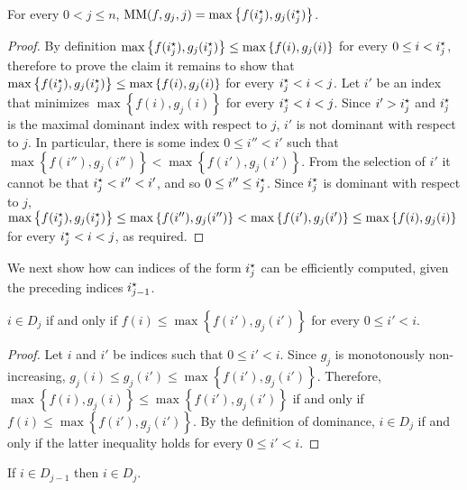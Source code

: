 \begin{claim}
\label{clm:dominant}
	For every $0 < j \leq n$, $\text{MM}(f, g_j, j) = \max\left\{f(\optIx), g_j(\optIx)\right\}$.
\end{claim}

\begin{proof}
	By definition $\max\left\{f(\optIx), g_j(\optIx)\right\} \leq \max\left\{f(i), g_j(i)\right\}$ for every $0 \leq i < \optIx$, therefore to prove the claim it remains to show that $\max\left\{f(\optIx), g_j(\optIx)\right\} \leq \max\left\{f(i), g_j(i)\right\}$ for every $\optIx < i < j$. Let $i'$ be an index that minimizes $\max\left\{f(i), g_j(i)\right\}$ for every $\optIx < i < j$. Since $i' > \optIx$ and $\optIx$ is the maximal dominant index with respect to $j$, $i'$ is not dominant with respect to $j$. In particular, there is some index $0 \leq i'' < i'$ such that $\max\left\{f(i''), g_j(i'')\right\} < \max\left\{f(i'), g_j(i')\right\}$. From the selection of $i'$ it cannot be that $\optIx < i'' < i'$, and so $0 \leq i'' \leq \optIx$. Since $\optIx$ is dominant with respect to $j$, $\max\left\{f(\optIx), g_j(\optIx)\right\} \leq \max\left\{f(i''), g_j(i'')\right\} < \max\left\{f(i'), g_j(i')\right\} \leq \max\left\{f(i), g_j(i)\right\}$ for every $\optIx < i < j$, as required.
\end{proof}

We next show how can indices of the form $\optIx$ can be efficiently computed, given the preceding indices $\optIx[j-1]$.

\begin{claim}
	\label{clm:dominance_a}
	$i \in D_j$ if and only if $f(i) \leq \max\left\{f(i'), g_j(i')\right\}$ for every $0 \leq i' < i$.
\end{claim}

\begin{proof}
	Let $i$ and $i'$ be indices such that $0 \leq i' < i$.
	Since $g_j$ is monotonously non-increasing, $g_j(i) \leq g_j(i') \leq \max\left\{f(i'), g_j(i')\right\}$. Therefore, $\max\left\{f(i), g_j(i)\right\} \leq \max\left\{f(i'), g_j(i')\right\}$ if and only if $f(i) \leq \max\left\{f(i'), g_j(i')\right\}$. By the definition of dominance, $i \in D_j$ if and only if the latter inequality holds for every $0 \leq i' < i$.
\end{proof}

\begin{claim}
	\label{clm:dominance_b}
	If $i \in D_{j-1}$ then $i \in D_j$.
\end{claim}

